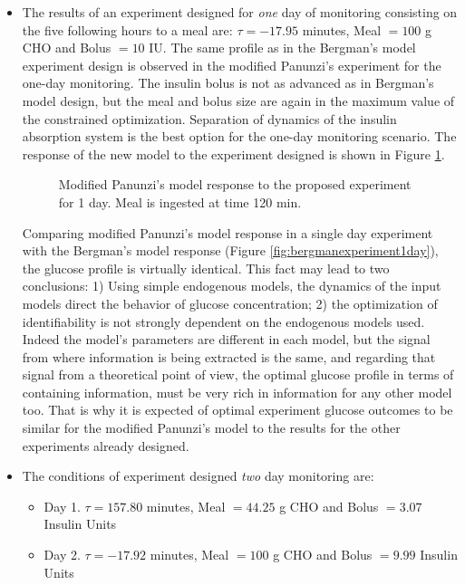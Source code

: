 \begin{itemize}
\item{The results of an experiment designed for \textit{one} day of monitoring consisting on the five following hours to a meal are: $\tau = -17.95$ minutes, Meal $= 100$ g CHO and Bolus $=10$ IU. The same profile as in the Bergman's model experiment design is observed in the modified Panunzi's experiment for the one-day monitoring. The insulin bolus is not as advanced as in Bergman's model design, but the meal and bolus size are again in the maximum value of the constrained optimization. Separation of dynamics of the insulin absorption system is the best option for the one-day monitoring scenario. The response of the new model to the experiment designed is shown in Figure \ref{fig:optdesignpanunzi1day}.

\begin{figure}[hbt]
\centering
{}\caption{Modified Panunzi's model response to the proposed experiment for 1 day. Meal is ingested at time 120 min.}
\label{fig:optdesignpanunzi1day}
\end{figure}

Comparing modified Panunzi's model response in a single day experiment with the Bergman's model response (Figure \ref{fig:bergmanexperiment1day}), the glucose profile is virtually identical. This fact may lead to two conclusions: 1) Using simple endogenous models, the dynamics of the input models direct the behavior of glucose concentration; 2) the optimization of identifiability is not strongly dependent on the endogenous models used. Indeed the model's parameters are different in each model, but the signal from where information is being extracted is the same, and regarding that signal from a theoretical point of view, the optimal glucose profile in terms of containing information, must be very rich in information for any other model too. That is why it is expected of optimal experiment glucose outcomes to be similar for the modified Panunzi's model to the results for the other experiments already designed.}

\item{The conditions of experiment designed \textit{two} day monitoring are:

\begin{itemize}
	\item Day 1. $\tau = 157.80$ minutes, Meal $= 44.25$ g CHO and Bolus $=3.07$ Insulin Units
	\item Day 2. $\tau = -17.92$ minutes, Meal $= 100$ g CHO and Bolus $=9.99$ Insulin Units
\end{itemize}

}
\end{itemize}
